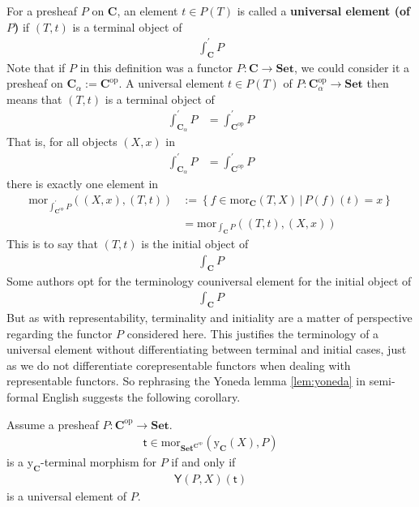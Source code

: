 For a presheaf $P$ on $\mathbf{C}$, an element $t \in P(T)$ is called a \textbf{universal element (of $P$)} if $(T,t)$ is a terminal object of
\begin{align*}
  \int_{\mathbf{C}}^{\prime}
  P
\end{align*}
Note that if $P$ in this definition was a functor $P \colon \mathbf{C} \rightarrow \mathbf{Set}$, we could consider it a presheaf on $\mathbf{C}_{\alpha} := \mathbf{C}^{\mathrm{op}}$.
A universal element $t \in P(T)$ of $P \colon \mathbf{C}_{\alpha}^{\mathrm{op}} \rightarrow \mathbf{Set}$ then means that $(T,t)$ is a terminal object of
\begin{align*}
  \int_{\mathbf{C}_{\alpha}}^{\prime}
  P
  &=
  \int_{\mathbf{C}^{\mathrm{op}}}^{\prime}
  P
\end{align*}
That is, for all objects $(X,x)$ in
\begin{align*}
  \int_{\mathbf{C}_{\alpha}}^{\prime}
  P
  &=
  \int_{\mathbf{C}^{\mathrm{op}}}^{\prime}
  P
\end{align*}
there is exactly one element in
\begin{align*}
  \mathrm{mor}_{\int_{\mathbf{C}^{\mathrm{op}}}^{\prime}P}
  \left(
    (X,x),
    (T,t)
  \right)
  &:=
  \left\lbrace
      f
      \in
      \mathrm{mor}_{\mathbf{C}}(T,X)
    \,
    \vert
    \,
      P(f)(t)
      =
      x
  \right\rbrace
  \\
  &=
  \mathrm{mor}_{\int_{\mathbf{C}}P}
  \left(
    (T,t),
    (X,x)
  \right)
\end{align*}
This is to say that $(T,t)$ is the initial object of
\begin{align*}
  \int_{\mathbf{C}}
  P
\end{align*}
Some authors opt for the terminology {\glqq}couniversal element{\grqq} for the initial object of
\begin{align*}
  \int_{\mathbf{C}}
  P
\end{align*}
But as with representability, terminality and initiality are a matter of perspective regarding the functor $P$ considered here.
This justifies the terminology of a universal element without differentiating between terminal and initial cases, just as we do not differentiate corepresentable functors when dealing with representable functors.
So rephrasing the Yoneda lemma \ref{lem:yoneda} in semi-formal English suggests the following corollary.
\\
\begin{cor}
\label{cor:unielemequivuni1}
Assume a presheaf $P \colon \mathbf{C}^{\mathrm{op}} \rightarrow \mathbf{Set}$.
\begin{align*}
  \mathsf{t}
  \in
  \mathrm{mor}_{\mathbf{Set}^{\mathbf{C}^{\mathrm{op}}}}
  (\mathrm{y}_{\mathbf{C}}(X),P)
\end{align*}
is a $\mathrm{y}_{\mathbf{C}}$-terminal morphism for $P$ if and only if
\begin{align*}
  \mathsf{Y}(P,X)(\mathsf{t})
\end{align*}
is a universal element of $P$.
\end{cor}
